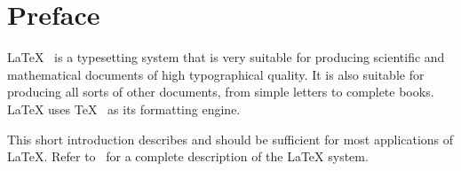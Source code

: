 

\chapter{Preface}

\LaTeX{}~\cite{manual} is a typesetting system that is very
suitable for producing scientific and mathematical documents of high
typographical quality. It is also suitable for producing all
sorts of other documents, from simple letters to complete books.
\LaTeX{} uses \TeX{}~\cite{texbook} as its formatting engine.

This short introduction describes \LaTeXe{} and should be sufficient
for most applications of \LaTeX. Refer to~\cite{manual,companion} for
a complete description of the \LaTeX{} system.

